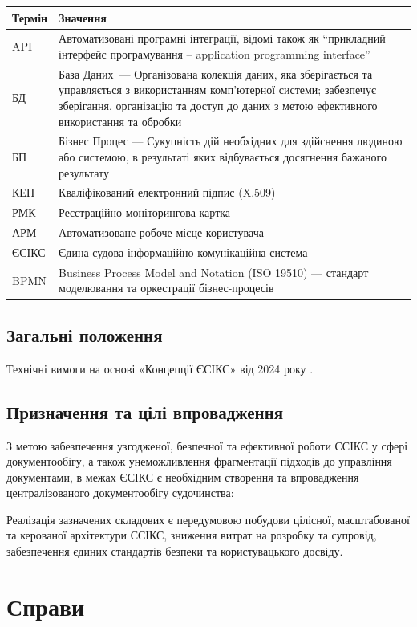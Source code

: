 \documentclass{article}
\begin{document}
\begin{longtable}{p{4cm}p{10cm}}
\toprule
\textbf{Термін} & \textbf{Значення} \\
\midrule
API & Автоматизовані програмні інтеграції, відомі також як “прикладний інтерфейс програмування – application programming interface” \\
БД & База Даних — Організована колекція даних, яка зберігається та управляється з використанням комп'ютерної системи; забезпечує зберігання, організацію та доступ до даних з метою ефективного використання та обробки \\
БП & Бізнес Процес — Сукупність дій необхідних для здійснення людиною або системою, в результаті яких відбувається досягнення бажаного результату \\
КЕП & Кваліфікований електронний підпис (X.509) \\
РМК & Реєстраційно-моніторингова картка \\
АРМ & Автоматизоване робоче місце користувача \\
ЄСІКС & Єдина судова інформаційно-комунікаційна система \\
BPMN & Business Process Model and Notation (ISO 19510) — стандарт моделювання та оркестрації бізнес-процесів \\
\bottomrule
\end{longtable}

\newpage
\subsection*{Загальні положення}

Технічні вимоги на основі «Концепції ЄСІКС» від 2024 року \cite{esiks}.

\subsection*{Призначення та цілі впровадження}
З метою забезпечення узгодженої, безпечної та ефективної роботи ЄСІКС у сфері документообігу,
а також унеможливлення фрагментації підходів до управління документами,
в межах ЄСІКС є необхідним створення та впровадження централізованого документообігу судочинства:

Реалізація зазначених складових є передумовою побудови цілісної, масштабованої та керованої архітектури ЄСІКС,
зниження витрат на розробку та супровід, забезпечення єдиних стандартів безпеки та користувацького досвіду.

\newpage
\section{Справи}
\end{document}
